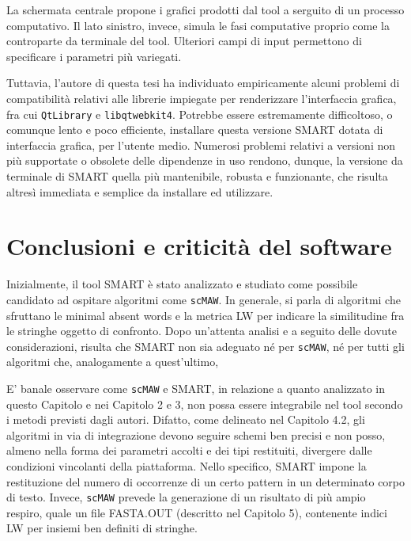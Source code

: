 La schermata centrale propone i grafici prodotti dal tool a serguito di un processo computativo. Il lato sinistro, invece, simula le fasi computative proprio come la controparte da terminale del tool. Ulteriori campi di input permettono di specificare i parametri più variegati.

\vspace{3mm}

Tuttavia, l'autore di questa tesi ha individuato empiricamente alcuni problemi di compatibilità relativi alle librerie impiegate per renderizzare l'interfaccia grafica, fra cui \verb|QtLibrary| e \verb|libqtwebkit4|. Potrebbe essere estremamente difficoltoso, o comunque lento e poco efficiente, installare questa versione SMART dotata di interfaccia grafica, per l'utente medio. Numerosi problemi relativi a versioni non più supportate o obsolete delle dipendenze in uso rendono, dunque, la versione da terminale di SMART quella più mantenibile, robusta e funzionante, che risulta altresì immediata e semplice da installare ed utilizzare.

\section{Conclusioni e criticità del software}

Inizialmente, il tool SMART è stato analizzato e studiato come possibile candidato ad ospitare algoritmi come \verb|scMAW|. In generale, si parla di algoritmi che sfruttano le minimal absent words e la metrica LW per indicare la similitudine fra le stringhe oggetto di confronto. Dopo un'attenta analisi e a seguito delle dovute considerazioni, risulta che SMART non sia adeguato né per \verb|scMAW|, né per tutti gli algoritmi che, analogamente a quest'ultimo, 

E' banale osservare come \verb|scMAW| e SMART, in relazione a quanto analizzato in questo Capitolo e nei Capitolo 2 e 3, non possa essere integrabile nel tool secondo i metodi previsti dagli autori. Difatto, come delineato nel Capitolo 4.2, gli algoritmi in via di integrazione devono seguire schemi ben precisi e non posso, almeno nella forma dei parametri accolti e dei tipi restituiti, divergere dalle condizioni vincolanti della piattaforma. Nello specifico, SMART impone la restituzione del numero di occorrenze di un certo pattern in un determinato corpo di testo. Invece, \verb|scMAW| prevede la generazione di un risultato di più ampio respiro, quale un file FASTA.OUT (descritto nel Capitolo 5), contenente indici LW per insiemi ben definiti di stringhe.


